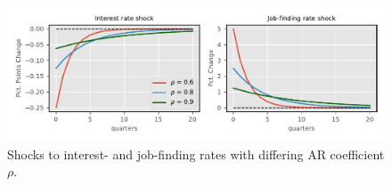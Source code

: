 





\begin{figure}[H]
\centering
\includegraphics[width=.98\linewidth]{mainmatter/plots/C_analysis/ra_q_shocks.pdf} 
\caption{Shocks to interest- and job-finding rates with differing AR coefficient $\rho$.}
\label{fig:ra_q_shocks}
\end{figure}


